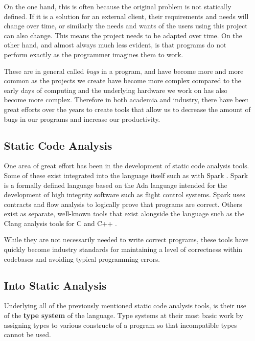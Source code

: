 \documentclass{l4proj}
\begin{document}
On the one hand, this is often because the original problem is not statically defined.
If it is a solution for an external client, their requirements and needs will change over time, or similarly the needs and wants of the users using this project can also change.
This means the project needs to be adapted over time.
On the other hand, and almost always much less evident, is that programs do not perform exactly as the programmer imagines them to work.

These are in general called \emph{bugs} in a program, and have become more and more common as the projects we create have become more complex compared to the early days of computing and the underlying hardware we work on has also become more complex.
Therefore in both academia and industry, there have been great efforts over the years to create tools that allow us to decrease the amount of bugs in our programs and increase our productivity.

\subsection{Static Code Analysis}

One area of great effort has been in the development of static code analysis tools.
Some of these exist integrated into the language itself such as with Spark \citep{Carre1990}.
Spark is a formally defined language based on the Ada \citep{Ada1979} language intended for the development of high integrity software such as flight control systems.
Spark uses contracts and flow analysis to logically prove that programs are correct.
Others exist as separate, well-known tools that exist alongside the language such as the Clang analysis tools for C and C++ \citep{kremenek2008}.

While they are not necessarily needed to write correct programs, these tools have quickly become industry standards for maintaining a level of correctness within codebases and avoiding typical programming errors.

\subsection{Into Static Analysis}

Underlying all of the previously mentioned static code analysis tools, is their use of the \textbf{type system} of the language.
Type systems at their most basic work by assigning types to various constructs of a program so that incompatible types cannot be used.
\end{document}
